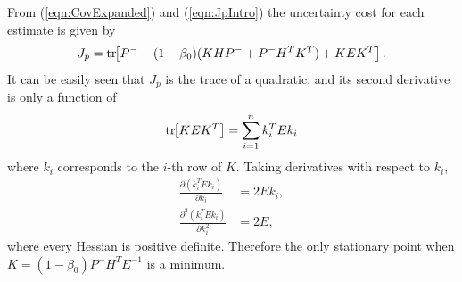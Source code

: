 \documentclass[letterpaper, paper,10pt]{AAS}		%
\newcommand{\bracket}[1]{\ensuremath{\left[ #1 \right]}}
\newcommand{\refeqn}[1]{(\ref{eqn:#1})}
\newcommand{\tr}[1]{\mathrm{tr}\ensuremath{\negthickspace\bracket{#1}}}
\newcommand{\deriv}[2]{\ensuremath{\frac{\partial #1}{\partial #2}}}
\renewcommand{\Re}{\ensuremath{\mathbb{R}}}
\begin{document}
\begin{appendix}
From \refeqn{CovExpanded} and \refeqn{JpIntro} the uncertainty cost for each estimate is given by
\begin{align}
\label{eqn:JpAppendixC}
J_p=\tr{P^--(1-\beta_{0})(KHP^-+P^-H^TK^T)+KEK^T}.
\end{align}
It can be easily seen that $J_p$ is the trace of a quadratic, and its second derivative is only a function of
\begin{align}
\tr{KEK^T}=\sum\limits_{i=1}^nk_i^TEk_i
\end{align}
where $k_i$ corresponds to the $i$-th row of $K$.
Taking derivatives with respect to $k_i$,
\begin{align}
\deriv{(k_i^TEk_i)}{k_i}&=2Ek_i,
\\
\frac{\partial^2(k_i^TEk_i)}{\partial k_i^2}&=2E,
\end{align}
where every Hessian is positive definite.
Therefore the only stationary point when $K=(1-\beta_{0})P^-H^TE^{-1}$ is a minimum.

\end{appendix}
\end{document}
